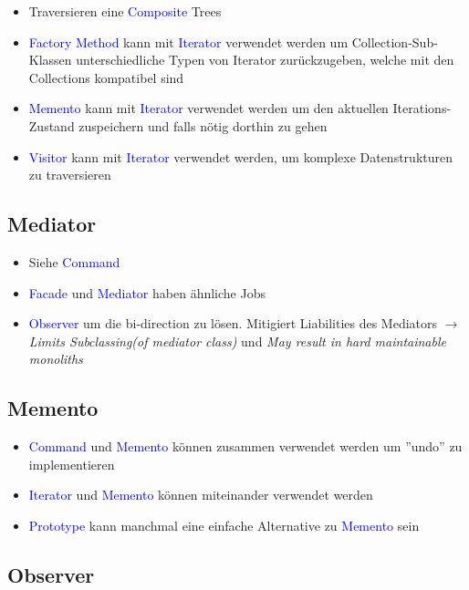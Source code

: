 \begin{itemize}
    \item Traversieren eine \textcolor{blue}{Composite} Trees
    \item \textcolor{blue}{Factory Method} kann mit \textcolor{blue}{Iterator} verwendet werden um  Collection-Sub-Klassen unterschiedliche Typen von Iterator zurückzugeben, welche mit den Collections kompatibel sind
    \item \textcolor{blue}{Memento} kann mit \textcolor{blue}{Iterator} verwendet werden um den aktuellen Iterations-Zustand zuspeichern und falls nötig dorthin zu gehen
    \item \textcolor{blue}{Visitor} kann mit \textcolor{blue}{Iterator} verwendet werden, um komplexe Datenstrukturen zu traversieren
\end{itemize}


\subsection{Mediator}

\begin{itemize}
    \item Siehe \textcolor{blue}{Command}
    \item \textcolor{blue}{Facade} und \textcolor{blue}{Mediator} haben ähnliche Jobs
    \item \textcolor{blue}{Observer} um die bi-direction zu lösen. Mitigiert Liabilities des Mediators $\rightarrow$ \textit{Limits Subclassing(of mediator class)} und \textit{May result in hard maintainable monoliths}
\end{itemize}

\subsection{Memento}

\begin{itemize}
    \item \textcolor{blue}{Command} und \textcolor{blue}{Memento} können zusammen verwendet werden um ''undo'' zu implementieren
    \item \textcolor{blue}{Iterator} und \textcolor{blue}{Memento} können miteinander verwendet werden
    \item \textcolor{blue}{Prototype} kann manchmal eine einfache Alternative zu \textcolor{blue}{Memento} sein
\end{itemize}

\subsection{Observer}

